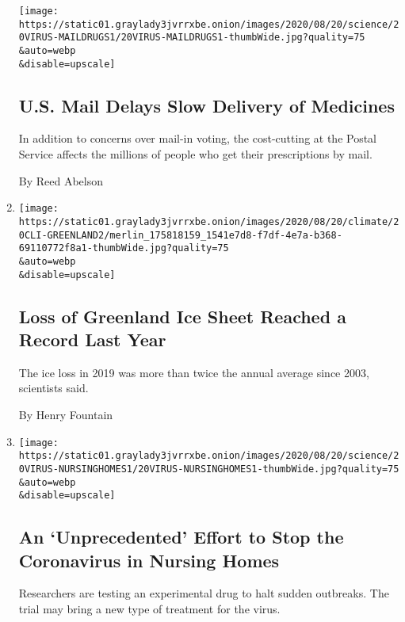 \begin{enumerate}
  \texttt{[image: https://static01.graylady3jvrrxbe.onion/images/2020/08/20/science/20VIRUS-MAILDRUGS1/20VIRUS-MAILDRUGS1-thumbWide.jpg?quality=75\\\&auto=webp\\\&disable=upscale]}

  \hypertarget{us-mail-delays-slow-delivery-of-medicines}{%
  \subsection{U.S. Mail Delays Slow Delivery of
  Medicines}\label{us-mail-delays-slow-delivery-of-medicines}}

  In addition to concerns over mail-in voting, the cost-cutting at the
  Postal Service affects the millions of people who get their
  prescriptions by mail.

  By Reed Abelson
\item
  \href{/2020/08/20/climate/greenland-ice-loss-climate-change.html}{}

  \texttt{[image: https://static01.graylady3jvrrxbe.onion/images/2020/08/20/climate/20CLI-GREENLAND2/merlin\_175818159\_1541e7d8-f7df-4e7a-b368-69110772f8a1-thumbWide.jpg?quality=75\\\&auto=webp\\\&disable=upscale]}

  \hypertarget{loss-of-greenland-ice-sheet-reached-a-record-last-year}{%
  \subsection{Loss of Greenland Ice Sheet Reached a Record Last
  Year}\label{loss-of-greenland-ice-sheet-reached-a-record-last-year}}

  The ice loss in 2019 was more than twice the annual average since
  2003, scientists said.

  By Henry Fountain
\item
  \href{/2020/08/20/health/coronavirus-nursing-homes.html}{}

  \texttt{[image: https://static01.graylady3jvrrxbe.onion/images/2020/08/20/science/20VIRUS-NURSINGHOMES1/20VIRUS-NURSINGHOMES1-thumbWide.jpg?quality=75\\\&auto=webp\\\&disable=upscale]}

  \hypertarget{an-unprecedented-effort-to-stop-the-coronavirus-in-nursing-homes}{%
  \subsection{An `Unprecedented' Effort to Stop the Coronavirus in
  Nursing
  Homes}\label{an-unprecedented-effort-to-stop-the-coronavirus-in-nursing-homes}}

  Researchers are testing an experimental drug to halt sudden outbreaks.
  The trial may bring a new type of treatment for the virus.


\end{enumerate}
